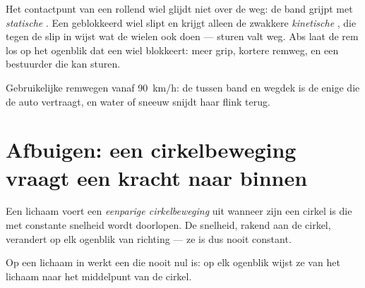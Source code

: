 \begin{remark}\label{rem:g11:forces-and-motion:abs}
Het contactpunt van een rollend wiel glijdt niet over de weg: de band
grijpt met \emph{statische} . Een geblokkeerd wiel slipt en
krijgt alleen de zwakkere \emph{kinetische} , die tegen de slip
in wijst wat de wielen ook doen --- sturen valt weg. Abs laat de rem los
op het ogenblik dat een wiel blokkeert: meer grip, kortere remweg, en een
bestuurder die kan sturen.
\end{remark}

\begin{omfigure}

{\small Gebruikelijke remwegen vanaf \qty{90}{km/h}: de  tussen
band en wegdek is de enige  die de auto vertraagt, en water of
sneeuw snijdt haar flink terug.}
\end{omfigure}

\section{Afbuigen: een cirkelbeweging vraagt een kracht naar binnen}

\begin{definition}\label{def:g11:forces-and-motion:ucm}
Een lichaam voert een \emph{eenparige cirkelbeweging} uit wanneer zijn  een cirkel is die met constante
snelheid wordt doorlopen. De snelheid, rakend aan de cirkel, verandert op
elk ogenblik van richting --- ze is dus nooit constant.
\end{definition}

\begin{proposition}\label{prop:g11:forces-and-motion:inward}
Op een lichaam in  werkt een 
die nooit nul is: op elk ogenblik wijst ze van het lichaam naar het
middelpunt van de cirkel.
\end{proposition}

